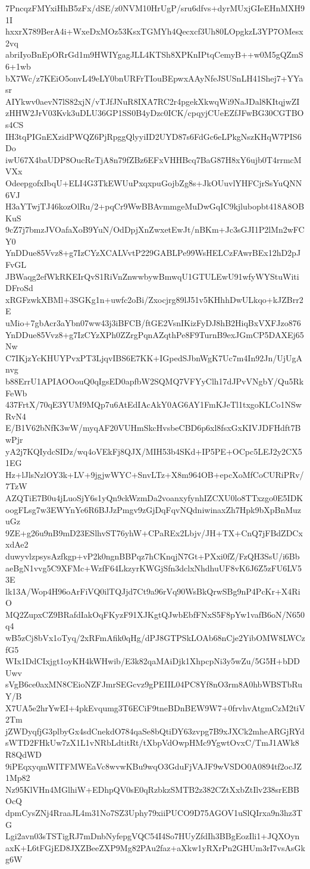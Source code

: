 7PncqzFMYxiHhB5zFx/dSE/z0NVM10HrUgP/sru6dfvs+dyrMUxjGIeEHnMXH91I
hxxrX789BerA4i+WxeDxMOz53KsxTGMYh4Qecxcf3Uh80LOpgkzL3YP7OMesx2vq
abriIyoBnEpORrGd1m9HWIYgagJLL4KTSh8XPKnIPtqCemyB++w0M5gQZmS6+1wb
bX7Wc/z7KEiO5onvL49eLY0bnURFrTIouBEpwxAAyNfeJSUSnLH41Shej7+YYasr
AIYkwv0aevN7lS82xjN/vTJfJNuR8IXA7RC2r4pgekXkwqWi9NaJDal8KItqjwZI
zHHW2JrV03Kvk3uDLU36GP1SS0B4yDzc0ICK/cpqyjCUeEZfJFwBG30CGTBOs4CS
IH3tqPIGnEXzidPWQZ6PjRpggQlyyiID2UYD87s6FdGc6eLPkgNszKHqW7PIS6Do
iwU67X4baUDP8OucReTjA8n79fZBz6EFxVHHBcq7BaG87H8xY6ujb0T4rrmcMVXx
OdeepgofxIbqU+ELI4G3TkEWUuPxqxpuGojbZg8s+JkOUuvlYHFCjrSsYuQNN6VJ
H3aYTwjTJ46kozOlRu/2+pqCr9WwBBAvmmgeMuDwGqIC9kjlubopbt418A8OBKuS
9cZ7j7bmzJVOafaXoB9YuN/OdDpjXnZwxetEwJt/nBKm+Jc3sGJI1P2lMn2wFCY0
YnDDue85Vvz8+g7IzCYzXCALVvtP229GABLPe99WsHELCzFAwrBEx12hD2pJFvGL
JBWaqg2efWkRKEIrQvS1RiVnZnwwbywBmwqU1GTULEwU91wfyWYStuWitiDFroSd
xRGFzwkXBMl+3SGKg1n+uwfc2oBi/Zxocjrg89lJ51v5KHhhDwULkqo+kJZBrr2E
uMio+7gbAcr3aYbn07ww43j3iBFCB/ftGE2VsnIKizFyDJ8hB2HiqBxVXFJzo876
YnDDue85Vvz8+g7IzCYzXPh0ZZrgPqnAZqthPe8F9TurnB9exJGmCP5DAXEj65Nw
C7IKjzYcKHUYPvxPT3LjqvIBS6E7KK+IGpedSJbnWgK7Uc7m4In92Jn/UjUgAnvg
b88ErrU1APIAOOouQ0qIgsED0apfbW2SQMQ7VFYyClh17dJPvVNgbY/Qu5RkFeWb
437FrtX/70qE3YUM9MQp7u6AtEdIAcAkY0AG6AY1FmKJeTl1txgoKLCo1NSwRvN4
E/B1V62bNfK3wW/myqAF20VUHmSkcHvsbeCBD6p6xl8fsxGxKIVJDFHdft7BwPjr
yA2j7KQIydcSIDz/wq4oVEkFj8QJX/MIH53b4SKd+IP5PE+OCpc5LEJ2y2CX51EG
Hz+lJlsNzlOY3k+LV+9jgjwWYC+SnvLTz+X8m964OB+epcXoMfCoCURiPRv/7TzW
AZQTiE7B0u4jLuoSjY6s1yQn9ckWzmDa2voanxyfynhIZCXU0lo8TTxzgo0E5IDK
oogFLsg7w3EWYnYe6R6BJJzPmgv9zGjDqFqvNQdniwinaxZh7Hpk9bXpBnMuzuGz
9ZE+g26u9nB9mD23ESlhvST76yhW+CPaREx2Lbjv/JH+TX+CnQ7jFBdZDCxxdAe2
duwyvlzpsysAzfkgp+vP2k0ngnBBPqz7hCKnqjN7Gt+PXxi0fZ/FzQH3SsU/i6Bb
aeBgN1vvg5C9XFMc+WzfF64LkzyrKWGjSfn3dclxNhdhuUF8vK6J6Z5zFU6LV53E
lk13A/Wop4H96oArFiVQ0ilTQJjd7Ct9a96rVq90WsBkQrwSBg9nP4PcKr+X4RiO
MQ2ZupxCZ9BRafdIakOqFKyzF91XJKgtQJwbEbfFNxS5F8pYw1vafB6oN/N650q4
wB5zCj8bVx1oTyq/2xRFmAfik0qHg/dPJ8GTPSkLOAb68nCje2YibOMW8LWCzfG5
WIx1DdCIxjgt1oyKH4kWHwib/E3k82qaMAiDjk1XhpcpNi3y5wZu/5G5H+bDDUwv
sVgB6ce0axMN8CEioNZFJmrSEGcvz9gPEIIL04PC8Yf8nO3rm8A0hbWBSTbRuY/B
X7UA5e2hrYwEI+4pkEvqumg3T6ECiF9tneBDnBEW9W7+0frvhvAtgmCzM2tiV2Tm
jZWDyqfjG3plbyGx4sdCnekdO784qaSe8bQtiDY63zvpg7B9xJXCk2mheARGjRYd
sWTD2FHkUw7zX1L1vNRbLdtitRt/tXbpVdOwpHMc9YgwtOvxC/TmJ1AWk8R8QdWD
9iPEqxyqmWITFMWEaVc8wvwKBu9wqO3GduFjVAJF9wVSDO0A0894tf2ocJZ1Mp82
Nz95KlVHn4MGlhiW+EDhpQV0sE0qRzbkzSMTB2z382CZtXxbZtIlv238srEBBOcQ
dpmCysZNj4RraaJL4m31No7SZ3Uphy79xiiPUCO9D75AGOV1uSlQIrxa9n3hz3TG
Lgi2avn03sTSTigRJ7mDnbNyfepgVQC54I4So7HUyZfdIh3BBgEozIli1+JQXOyn
axK+L6tFGjED8JXZBeeZXP9Mg82PAu2faz+aXkw1yRXrPn2GHUm3rI7vsAsGkg6W
